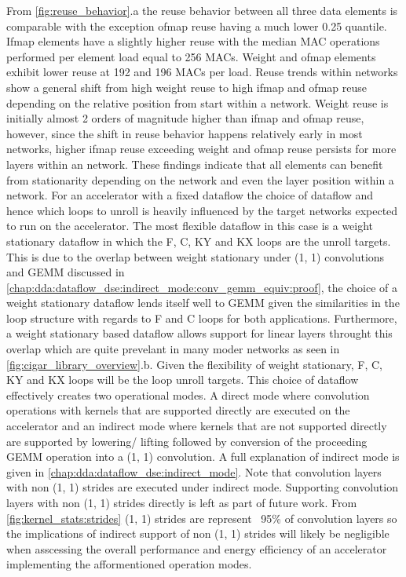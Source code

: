 From \autoref{fig:reuse_behavior}.a the reuse behavior between all three data
elements is comparable with the exception ofmap reuse having a much lower 0.25
quantile. Ifmap elements have a slightly higher reuse with the median MAC
operations performed per element load equal to 256 MACs. Weight and ofmap
elements exhibit lower reuse at 192 and 196 MACs per load. Reuse trends within
networks show a general shift from high weight reuse to high ifmap and ofmap
reuse depending on the relative position from start within a network. Weight
reuse is initially almost 2 orders of magnitude higher than ifmap and ofmap
reuse, however, since the shift in reuse behavior happens relatively early in
most networks, higher ifmap reuse exceeding weight and ofmap reuse persists for
more layers within an network. These findings indicate that all elements can
benefit from stationarity depending on the network and even the layer position
within a network. For an accelerator with a fixed dataflow the choice of
dataflow and hence which loops to unroll is heavily influenced by the target
networks expected to run on the accelerator. The most flexible dataflow in this
case is a weight stationary dataflow in which the F, C, KY and KX loops are the
unroll targets. This is due to the overlap between weight stationary under (1, 1)
convolutions and GEMM discussed in
\autoref{chap:dda:dataflow_dse:indirect_mode:conv_gemm_equiv:proof}, the choice
of a weight stationary dataflow lends itself well to \ac{GEMM} given the
similarities in the loop structure with regards to F and C loops for both
applications. Furthermore, a weight stationary based dataflow allows support for
linear layers throught this overlap which are quite prevelant in many moder
networks as seen in \autoref{fig:cigar_library_overview}.b. Given the
flexibility of weight stationary, F, C, KY and KX loops will be the loop unroll
targets. This choice of dataflow effectively creates two operational modes. A
direct mode where convolution operations with kernels that are supported
directly are executed on the accelerator and an indirect mode where kernels that
are not supported directly are supported by lowering/ lifting followed by
conversion of the proceeding GEMM operation into a (1, 1) convolution. A full
explanation of indirect mode is given in
\autoref{chap:dda:dataflow_dse:indirect_mode}. Note that convolution layers with
non (1, 1) strides are executed under indirect mode. Supporting convolution layers
with non (1, 1) strides directly is left as part of future work. From
\autoref{fig:kernel_stats:strides} (1, 1) strides are represent ~95\% of
convolution layers so the implications of indirect support of non (1, 1) strides
will likely be negligible when asscessing the overall performance and energy
efficiency of an accelerator implementing the afformentioned operation modes.

